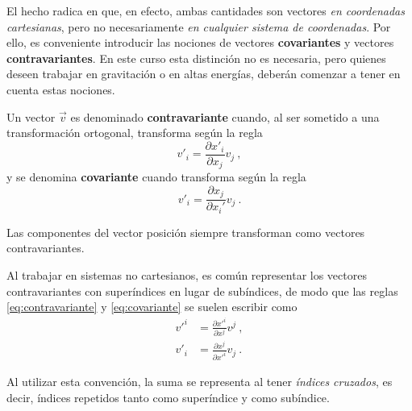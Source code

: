El hecho radica en que, en efecto, ambas cantidades son vectores \emph{en coordenadas cartesianas}, pero no necesariamente \emph{en cualquier sistema de coordenadas}. Por ello, es conveniente introducir las nociones de vectores \textbf{covariantes} y vectores \textbf{contravariantes}. En este curso esta distinción no es necesaria, pero quienes deseen trabajar en gravitación o en altas energías, deberán comenzar a tener en cuenta estas nociones.

\begin{defi} 
    Un vector $\vec{v}$ es denominado \textbf{contravariante} cuando, al ser sometido a una transformación ortogonal, transforma según la regla
    \begin{equation} \label{eq:contravariante}
        v'_i = \frac{\partial x'_i}{\partial x_j} v_j \ ,
    \end{equation}
    y se denomina \textbf{covariante} cuando transforma según la regla
    \begin{equation} \label{eq:covariante}
        v'_i = \frac{\partial x_j}{\partial x_i'} v_j \ .
    \end{equation}

    Las componentes del vector posición siempre transforman como vectores contravariantes.
\end{defi}


Al trabajar en sistemas no cartesianos, es común representar los vectores contravariantes con superíndices en lugar de subíndices, de modo que las reglas \eqref{eq:contravariante} y \eqref{eq:covariante} se suelen escribir como
\begin{align*}
    v'^i & = \frac{\partial x'^{i}}{\partial x^j} v^j \ , \\
    v'_i & = \frac{\partial x^j}{\partial x'^{i}} v_j \ .
\end{align*}

Al utilizar esta convención, la suma se representa al tener \emph{índices cruzados}, es decir, índices repetidos tanto como superíndice y como subíndice.